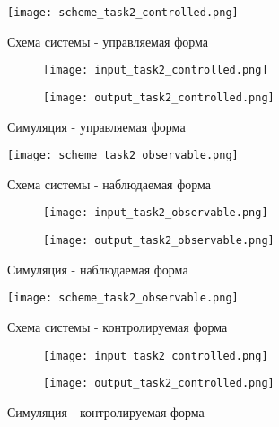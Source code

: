 \newpage

\begin{figure}[ht]
    \centering
    \texttt{[image: scheme\_task2\_controlled.png]}
	\caption{Схема системы - управляемая форма}
\end{figure}
\begin{figure}[h]
	\begin{subfigure}{0.5\textwidth}
		\texttt{[image: input\_task2\_controlled.png]} 
	\end{subfigure}
	\begin{subfigure}{0.5\textwidth}
		\texttt{[image: output\_task2\_controlled.png]}
	\end{subfigure}
	\caption{Симуляция - управляемая форма}
\end{figure}

\newpage
\begin{figure}[ht]
    \centering
    \texttt{[image: scheme\_task2\_observable.png]}
	\caption{Схема системы - наблюдаемая форма}
\end{figure}
\begin{figure}[h]
	\begin{subfigure}{0.5\textwidth}
		\texttt{[image: input\_task2\_observable.png]} 
	\end{subfigure}
	\begin{subfigure}{0.5\textwidth}
		\texttt{[image: output\_task2\_observable.png]}
	\end{subfigure}
	\caption{Симуляция - наблюдаемая форма}
\end{figure}

\begin{figure}[ht]
    \centering
    \texttt{[image: scheme\_task2\_observable.png]}
	\caption{Схема системы - контролируемая форма}
\end{figure}
\begin{figure}[h]
	\begin{subfigure}{0.5\textwidth}
		\texttt{[image: input\_task2\_controlled.png]} 
	\end{subfigure}
	\begin{subfigure}{0.5\textwidth}
		\texttt{[image: output\_task2\_controlled.png]}
	\end{subfigure}
	\caption{Симуляция - контролируемая форма}
\end{figure}

